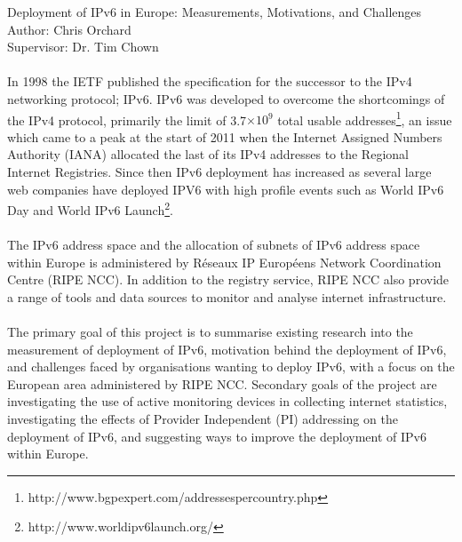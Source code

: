 \documentclass[pdflatex, a4paper,12pt]{article}
\providecommand{\e}[1]{\ensuremath{\times 10^{#1}}}
\begin{document}
\begin{center}
{\LARGE Deployment of IPv6 in Europe: Measurements, Motivations, and Challenges}\\[1em]

Author: Chris Orchard\\
Supervisor: Dr. Tim Chown
\end{center}

\paragraph{}

In 1998 the IETF published the specification for the successor to the IPv4
networking
protocol; IPv6. IPv6 was developed to overcome the shortcomings of the IPv4
protocol, primarily the limit of 3.7\e{9} total usable
addresses\footnote[1]{http://www.bgpexpert.com/addressespercountry.php},
an issue which came to a peak at the start of 2011 when the Internet Assigned Numbers Authority (IANA) 
allocated the last of its IPv4 addresses to the Regional Internet Registries.
Since then IPv6 deployment has increased as several large web companies have
deployed IPV6 with high profile events such as World IPv6
Day and World IPv6 Launch\footnote[2]{http://www.worldipv6launch.org/}.

\paragraph{}

The IPv6 address space and the allocation of subnets of IPv6 address space
within Europe is administered by Réseaux IP Européens Network Coordination
Centre (RIPE NCC). In addition to the registry service, RIPE NCC also provide a
range of tools and data sources to monitor and analyse internet infrastructure.

\paragraph{}

The primary goal of this project is to summarise existing research into the measurement
of deployment of IPv6, motivation behind the deployment of IPv6, and challenges
faced by organisations wanting to deploy IPv6, with a focus on the European area
administered by RIPE NCC. Secondary goals of the project are investigating the
use of active monitoring devices in collecting internet statistics,
investigating the effects of Provider Independent (PI) addressing on the
deployment of IPv6, and suggesting ways to improve the deployment of IPv6 within
Europe.
\end{document}

